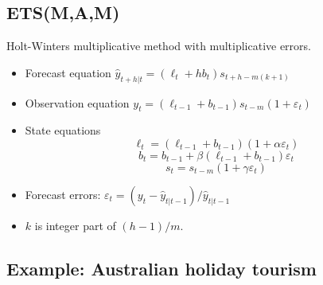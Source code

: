 \documentclass[]{book}
\newenvironment{Shaded}{\begin{snugshade}}{\end{snugshade}}
\newcommand{\DataTypeTok}[1]{\textcolor[rgb]{0.13,0.29,0.53}{#1}}
\newcommand{\KeywordTok}[1]{\textcolor[rgb]{0.13,0.29,0.53}{\textbf{#1}}}
\newcommand{\NormalTok}[1]{#1}
\newcommand{\OperatorTok}[1]{\textcolor[rgb]{0.81,0.36,0.00}{\textbf{#1}}}
\newcommand{\StringTok}[1]{\textcolor[rgb]{0.31,0.60,0.02}{#1}}
\begin{document}
\hypertarget{etsmam}{%
\subsection{ETS(M,A,M)}\label{etsmam}}

Holt-Winters multiplicative method with multiplicative errors.

\begin{itemize}
\item
  Forecast equation \(\hat{y}_{t+h|t} = (\ell_{t} + hb_{t}) s_{t+h-m(k+1)}\)
\item
  Observation equation \(y_t= (\ell_{t-1}+b_{t-1})s_{t-m}(1 + \varepsilon_t)\)
\item
  State equations \[\ell_t=(\ell_{t-1}+b_{t-1})(1+\alpha \varepsilon_t)\]
  \[b_t=b_{t-1} +\beta(\ell_{t-1}+b_{t-1}) \varepsilon_t\]
  \[s_t = s_{t-m}(1 + \gamma\varepsilon_t)\]
\item
  Forecast errors: \(\varepsilon_{t} = (y_t - \hat{y}_{t|t-1})/\hat{y}_{t|t-1}\)
\item
  \(k\) is integer part of \((h-1)/m\).
\end{itemize}

\hypertarget{example-australian-holiday-tourism}{%
\subsection{Example: Australian holiday tourism}\label{example-australian-holiday-tourism}}

\begin{Shaded}
\end{Shaded}
\end{document}
